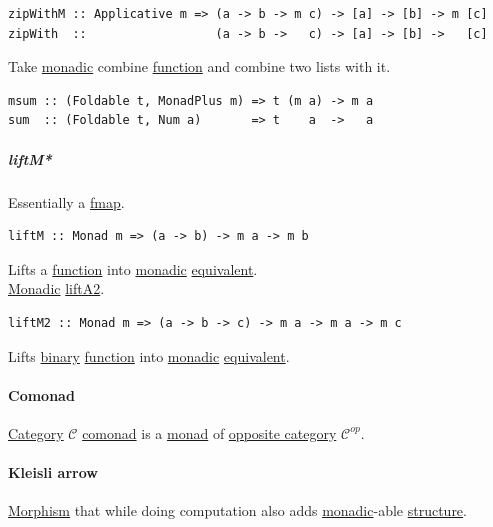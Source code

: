 \documentclass[a4paper,14pt,oneside]{book}
\begin{document}
\begin{verbatim}
zipWithM :: Applicative m => (a -> b -> m c) -> [a] -> [b] -> m [c]
zipWith  ::                  (a -> b ->   c) -> [a] -> [b] ->   [c]
\end{verbatim}

Take \hyperref[org6161b39]{monadic} combine \hyperref[org25ee224]{function} and combine two lists with it.\\

\begin{verbatim}
msum :: (Foldable t, MonadPlus m) => t (m a) -> m a
sum  :: (Foldable t, Num a)       => t    a  ->   a
\end{verbatim}

\subparagraph{\label{orgcf46dda}liftM*}
\label{sec:org33c134a}
\label{sec:org3c27601}
Essentially a \hyperref[org76de834]{fmap}.\\

\begin{verbatim}
liftM :: Monad m => (a -> b) -> m a -> m b
\end{verbatim}

Lifts a \hyperref[org25ee224]{function} into \hyperref[org6161b39]{monadic} \hyperref[orgdd708f5]{equivalent}.\\

\label{sec:orgdbbf51a}
\hyperref[org6161b39]{Monadic} \hyperref[orgfd9d5a4]{liftA2}.\\
\begin{verbatim}
liftM2 :: Monad m => (a -> b -> c) -> m a -> m a -> m c
\end{verbatim}

Lifts \hyperref[org0a0e962]{binary} \hyperref[org25ee224]{function} into \hyperref[org6161b39]{monadic} \hyperref[orgdd708f5]{equivalent}.\\

\paragraph{\label{org7dfeb7a}Comonad}
\label{sec:org1f7b9a9}
\hyperref[org75ddcd0]{Category} \(\mathcal{C}\) \hyperref[org7dfeb7a]{comonad} is a \hyperref[org27993ff]{monad} of \hyperref[org86c9b4d]{opposite category} \(\mathcal{C}^{op}\).\\

\paragraph{\label{org31fe770}Kleisli arrow}
\label{sec:org0b15044}
\hyperref[orgb1a35cd]{Morphism} that while doing computation also adds \hyperref[org6161b39]{monadic}-able \hyperref[org2f999c6]{structure}.\\
\end{document}
